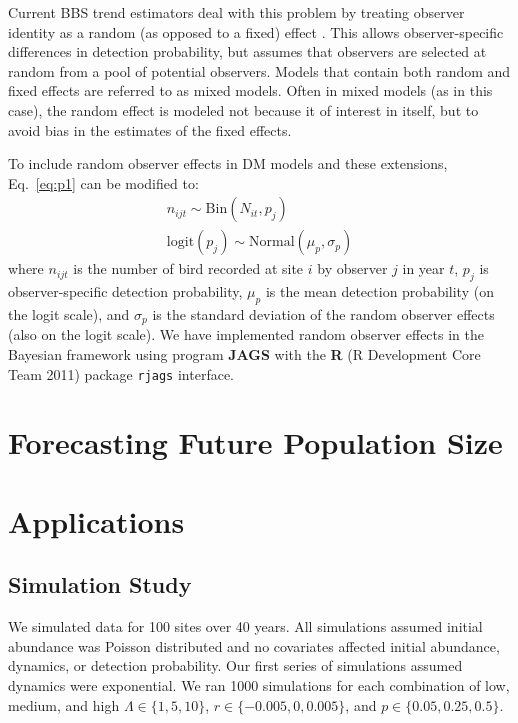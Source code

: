 \documentclass[12pt]{article}
\begin{document}
Current BBS trend estimators deal with this problem by
treating observer identity as a random (as opposed to a fixed)
effect \citep{link_sauer:2002,sauer_link:2011}.
This allows observer-specific differences in detection probability,
but assumes that observers are selected at random from a pool
of potential observers.  Models that contain both random and
fixed effects are referred to as mixed models.  Often in mixed
models (as in this case), the random effect is modeled not
because it of interest in itself, but to avoid bias in the
estimates of the fixed effects.

To include random observer effects in DM models and these extensions,
Eq.~\ref{eq:p1} can be modified to:
\begin{gather}
n_{ijt} \sim \mathrm{Bin}(N_{it}, p_j) \nonumber \\
\mathrm{logit}(p_j) \sim \mathrm{Normal}(\mu_p, \sigma_p)
\label{eq:pobs}
\end{gather}
where $n_{ijt}$ is the number of bird recorded at site $i$ by observer $j$ in
year $t$, $p_j$ is observer-specific detection probability, $\mu_p$ is the mean
detection probability (on the logit scale), and $\sigma_p$ is the standard
deviation of the random observer effects (also on the logit scale).
We have implemented random observer effects in the Bayesian framework
using program \textbf{JAGS} \citep[version 3.2.0]{plummer:2003}
with the \textbf{R} (R
Development Core Team 2011) package \texttt{rjags} \citep{plummer:2011}
interface.


\section{Forecasting Future Population Size}





\section{Applications}
\label{sec:app}

\subsection{Simulation Study}


We simulated data for 100 sites over 40 years.  All
simulations assumed initial abundance was Poisson distributed
and no covariates affected initial abundance, dynamics, or
detection probability.  Our first series of simulations
assumed dynamics were exponential.  We ran 1000 simulations for
each combination of low, medium, and high $\Lambda \in \{1,5,10\}$, $r
\in \{-0.005, 0, 0.005\}$, and
$p \in \{0.05, 0.25, 0.5\}$. %
\end{document}
